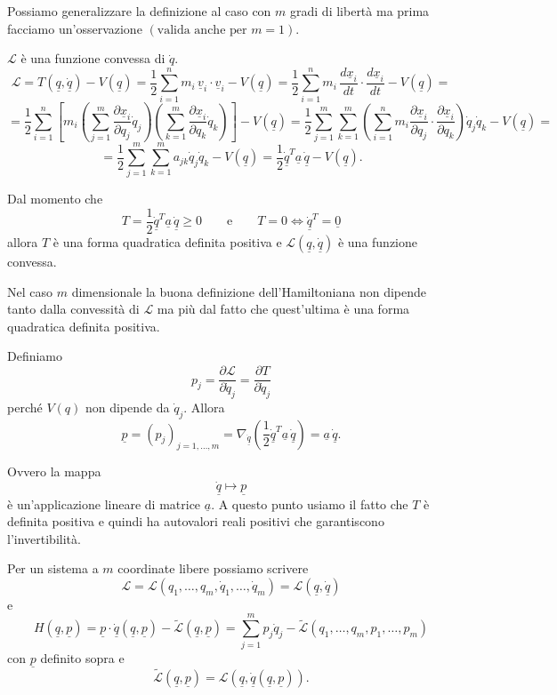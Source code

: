 Possiamo generalizzare la definizione al caso con \(m\) gradi di libertà ma prima facciamo un'osservazione \((\text{valida anche per }m=1)\).
\begin{oss}{}
\(\mathcal{L}\) è una funzione convessa di \(\dot q\).
\[
\mathcal{L}
=
T(\underline q,\dot{\underline q})-V(\underline q)
=
\frac{1}{2}\sum_{i=1}^{n}m_i\,\underline v_i\cdot \underline v_i
-
V(\underline q)
=
\frac{1}{2}\sum_{i=1}^{n}m_i\,
\frac{d\underline x_i}{dt}\cdot \frac{d\underline x_i}{dt}
-
V(\underline q)
=
\]
\[
=
\frac{1}{2}\sum_{i=1}^{n}
\left[
m_i
\left(
\sum_{j=1}^{m}\frac{\partial \underline x_i}{\partial q_j}\dot q_j
\right)
\left(
\sum_{k=1}^{m}\frac{\partial \underline x_i}{\partial q_k}\dot q_k
\right)
\right]
-
V(\underline q)
=
\frac{1}{2}\sum_{j=1}^{m}\sum_{k=1}^{m}
\left(
\sum_{i=1}^{n}m_i
\frac{\partial \underline x_i}{\partial q_j}\cdot
\frac{\partial \underline x_i}{\partial q_k}
\right)
\dot q_j\dot q_k -V(\underline{q})
=
\]
\[
=
\frac{1}{2}\sum_{j=1}^{m}\sum_{k=1}^{m}
a_{jk}\dot q_j\dot q_k
-
V(\underline q)
=
\frac{1}{2}\dot{\underline q}^{T}\underline a\,\dot{\underline q}
-
V(\underline q).
\]

Dal momento che
\[
T=
\frac{1}{2}\dot{\underline q}^{T}\underline a\,\dot{\underline q}\ge 0
\qquad
\text{e}
\qquad
T=0 \Longleftrightarrow \dot{\underline q}^{T}=\underline 0
\]
allora \(T\) è una forma quadratica definita positiva e \(\mathcal{L}(\underline q,\dot{\underline q})\) è una funzione convessa.

Nel caso \(m\) dimensionale la buona definizione dell'Hamiltoniana non dipende tanto dalla convessità di \(\mathcal{L}\) ma più dal fatto che quest'ultima è una forma quadratica definita positiva.

Definiamo
\[
p_j=
\frac{\partial \mathcal{L}}{\partial \dot q_j}
=
\frac{\partial T}{\partial \dot q_j}
\]
perché \(V(q)\) non dipende da \(\dot q_j\). Allora
\[
\underline p
=
(p_j)_{j=1,\ldots,m}
=
\nabla_{\dot{\underline q}}
\left(
\frac{1}{2}\dot{\underline q}^{T}\underline a\,\dot{\underline q}
\right)
=
\underline a\,\dot{\underline q}.
\]

Ovvero la mappa
\[
\dot{\underline q}\longmapsto \underline p
\]
è un'applicazione lineare di matrice \(\underline a\).
A questo punto usiamo il fatto che \(T\) è definita positiva e quindi ha autovalori reali positivi che garantiscono l'invertibilità.
\end{oss}
Per un sistema a \(m\) coordinate libere possiamo scrivere
\[
\mathcal{L}
=
\mathcal{L}(q_1,\ldots,q_m,\dot q_1,\ldots,\dot q_m)
=
\mathcal{L}(\underline q,\dot{\underline q})
\]
e
\[
H(\underline q,\underline p)
=
\underline p\cdot \dot{\underline q}(\underline q,\underline p)
-
\tilde{\mathcal{L}}(\underline q,\underline p)
=
\sum_{j=1}^{m}p_j\dot q_j
-
\tilde{\mathcal{L}}(q_1,\ldots,q_m,p_1,\ldots,p_m)
\]
con \(\underline p\) definito sopra e
\[
\tilde{\mathcal{L}}(\underline q,\underline p)
=
\mathcal{L}(\underline q,\dot{\underline q}(\underline q,\underline p)).
\]


